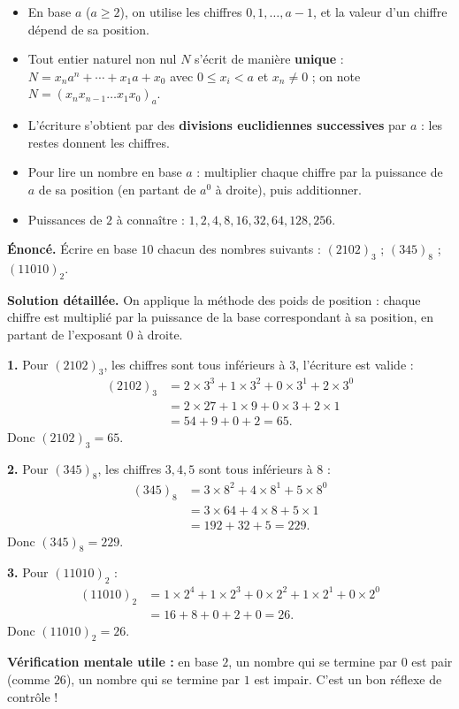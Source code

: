 \documentclass[11pt]{article}
\begin{document}
\begin{aretenir}
\begin{itemize}
\item En base $a$ ($a \ge 2$), on utilise les chiffres $0, 1, \ldots, a-1$, et la valeur d'un chiffre dépend de sa position.
\item Tout entier naturel non nul $N$ s'écrit de manière \textbf{unique} : $N = x_n a^n + \cdots + x_1 a + x_0$ avec $0 \le x_i < a$ et $x_n \neq 0$ ; on note $N = (x_n x_{n-1} \ldots x_1 x_0)_a$.
\item L'écriture s'obtient par des \textbf{divisions euclidiennes successives} par $a$ : les restes donnent les chiffres.
\item Pour lire un nombre en base $a$ : multiplier chaque chiffre par la puissance de $a$ de sa position (en partant de $a^0$ à droite), puis additionner.
\item Puissances de $2$ à connaître : $1, 2, 4, 8, 16, 32, 64, 128, 256$.
\end{itemize}
\end{aretenir}

\begin{exoresolu}
\textbf{Énoncé.} Écrire en base $10$ chacun des nombres suivants : $(2102)_3$ ; $(345)_8$ ; $(11010)_2$.

\tcblower
\textbf{Solution détaillée.} On applique la méthode des poids de position : chaque chiffre est multiplié par la puissance de la base correspondant à sa position, en partant de l'exposant $0$ à droite.

\textbf{1.} Pour $(2102)_3$, les chiffres sont tous inférieurs à $3$, l'écriture est valide :
\begin{align*}
(2102)_3 &= 2\times 3^3 + 1\times 3^2 + 0\times 3^1 + 2\times 3^0 \\
&= 2\times 27 + 1\times 9 + 0\times 3 + 2\times 1 \\
&= 54 + 9 + 0 + 2 = 65.
\end{align*}
Donc $(2102)_3 = 65$.

\textbf{2.} Pour $(345)_8$, les chiffres $3, 4, 5$ sont tous inférieurs à $8$ :
\begin{align*}
(345)_8 &= 3\times 8^2 + 4\times 8^1 + 5\times 8^0 \\
&= 3\times 64 + 4\times 8 + 5\times 1 \\
&= 192 + 32 + 5 = 229.
\end{align*}
Donc $(345)_8 = 229$.

\textbf{3.} Pour $(11010)_2$ :
\begin{align*}
(11010)_2 &= 1\times 2^4 + 1\times 2^3 + 0\times 2^2 + 1\times 2^1 + 0\times 2^0 \\
&= 16 + 8 + 0 + 2 + 0 = 26.
\end{align*}
Donc $(11010)_2 = 26$.

\textbf{Vérification mentale utile :} en base $2$, un nombre qui se termine par $0$ est pair (comme $26$), un nombre qui se termine par $1$ est impair. C'est un bon réflexe de contrôle !
\end{exoresolu}
\end{document}
